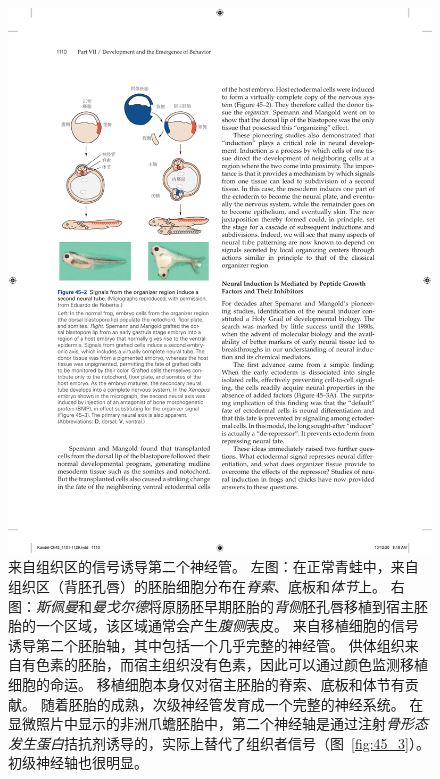 \begin{figure}[htbp]
	\centering
	\includegraphics[width=0.62\linewidth]{chap45/fig_45_2}
	\caption{来自组织区的信号诱导第二个神经管。
		左图：在正常青蛙中，来自组织区（背胚孔唇）的胚胎细胞分布在\textit{脊索}、底板和\textit{体节}上。
		右图：\textit{斯佩曼}和\textit{曼戈尔德}将原肠胚早期胚胎的\textit{背侧}胚孔唇移植到宿主胚胎的一个区域，该区域通常会产生\textit{腹侧}表皮。
		来自移植细胞的信号诱导第二个胚胎轴，其中包括一个几乎完整的神经管。
		供体组织来自有色素的胚胎，而宿主组织没有色素，因此可以通过颜色监测移植细胞的命运。
		移植细胞本身仅对宿主胚胎的脊索、底板和体节有贡献。
		随着胚胎的成熟，次级神经管发育成一个完整的神经系统。
		在显微照片中显示的非洲爪蟾胚胎中，第二个神经轴是通过注射\textit{骨形态发生蛋白}拮抗剂诱导的，实际上替代了组织者信号（图~\ref{fig:45_3}）。
		初级神经轴也很明显。}
	\label{fig:45_2}
\end{figure}


